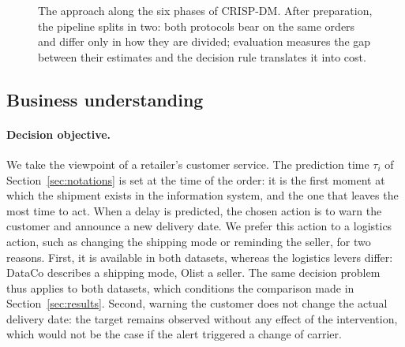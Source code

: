 \documentclass[11pt,a4paper]{article}
\theoremstyle{definition}
\begin{document}
\begin{figure}[!htbp]
\caption{The approach along the six phases of CRISP-DM. After preparation, the pipeline splits in two: both protocols bear on the same orders and differ only in how they are divided; evaluation measures the gap between their estimates and the decision rule translates it into cost.}
\label{fig:pipeline}
\end{figure}

\subsection{Business understanding}
\label{sec:business}

\paragraph{Decision objective.} We take the viewpoint of a retailer's customer service. The prediction time $\tau_i$ of Section~\ref{sec:notations} is set at the time of the order: it is the first moment at which the shipment exists in the information system, and the one that leaves the most time to act. When a delay is predicted, the chosen action is to warn the customer and announce a new delivery date. We prefer this action to a logistics action, such as changing the shipping mode or reminding the seller, for two reasons. First, it is available in both datasets, whereas the logistics levers differ: DataCo describes a shipping mode, Olist a seller. The same decision problem thus applies to both datasets, which conditions the comparison made in Section~\ref{sec:results}. Second, warning the customer does not change the actual delivery date: the target remains observed without any effect of the intervention, which would not be the case if the alert triggered a change of carrier.
\end{document}
